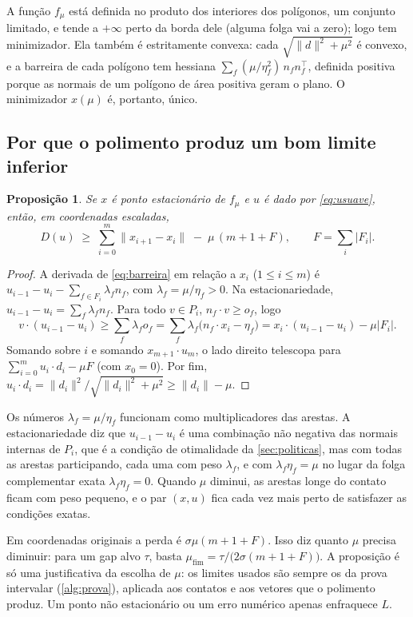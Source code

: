 \documentclass[11pt,a4paper]{article}
\theoremstyle{plain}\newtheorem{proposicao}{Proposição}
\theoremstyle{definition}\newtheorem{definicao}{Definição}
\theoremstyle{plain}\newtheorem{teorema}{Teorema}
\newcommand{\norm}[1]{\lVert#1\rVert}
\newcommand{\abs}[1]{\lvert#1\rvert}
\begin{document}
A função \(f_\mu\) está definida no produto dos interiores dos polígonos, um conjunto limitado, e tende a \(+\infty\) perto da borda dele (alguma folga vai a zero); logo tem minimizador. Ela também é estritamente convexa: cada \(\sqrt{\norm d^2+\mu^2}\) é convexo, e a barreira de cada polígono tem hessiana \(\sum_f(\mu/\eta_f^2)\,n_fn_f^{\top}\), definida positiva porque as normais de um polígono de área positiva geram o plano. O minimizador \(x(\mu)\) é, portanto, único.

\subsection{Por que o polimento produz um bom limite inferior}
\begin{proposicao}\label{prop:barreira}
Se \(x\) é ponto estacionário de \(f_\mu\) e \(u\) é dado por \eqref{eq:usuave}, então, em coordenadas escaladas,
\[
D(u)\;\ge\;\sum_{i=0}^m\norm{x_{i+1}-x_i}\;-\;\mu\,(m+1+F),\qquad F=\textstyle\sum_i\abs{F_i}.
\]
\end{proposicao}
\begin{proof}
A derivada de \eqref{eq:barreira} em relação a \(x_i\) (\(1\le i\le m\)) é \(u_{i-1}-u_i-\sum_{f\in F_i}\lambda_fn_f\), com \(\lambda_f=\mu/\eta_f>0\). Na estacionariedade, \(u_{i-1}-u_i=\sum_f\lambda_fn_f\). Para todo \(v\in P_i\), \(n_f\cdot v\ge o_f\), logo
\[
v\cdot(u_{i-1}-u_i)\ge\sum_f\lambda_fo_f=\sum_f\lambda_f\bigl(n_f\cdot x_i-\eta_f\bigr)=x_i\cdot(u_{i-1}-u_i)-\mu\abs{F_i}.
\]
Somando sobre \(i\) e somando \(x_{m+1}\cdot u_m\), o lado direito telescopa para \(\sum_{i=0}^mu_i\cdot d_i-\mu F\) (com \(x_0=0\)). Por fim, \(u_i\cdot d_i=\norm{d_i}^2/\sqrt{\norm{d_i}^2+\mu^2}\ge\norm{d_i}-\mu\).
\end{proof}
Os números \(\lambda_f=\mu/\eta_f\) funcionam como multiplicadores das arestas. A estacionariedade diz que \(u_{i-1}-u_i\) é uma combinação não negativa das normais internas de \(P_i\), que é a condição de otimalidade da \cref{sec:politicas}, mas com todas as arestas participando, cada uma com peso \(\lambda_f\), e com \(\lambda_f\eta_f=\mu\) no lugar da folga complementar exata \(\lambda_f\eta_f=0\). Quando \(\mu\) diminui, as arestas longe do contato ficam com peso pequeno, e o par \((x,u)\) fica cada vez mais perto de satisfazer as condições exatas.

Em coordenadas originais a perda é \(\sigma\mu(m+1+F)\). Isso diz quanto \(\mu\) precisa diminuir: para um gap alvo \(\tau\), basta \(\mu_{\text{fim}}=\tau/\bigl(2\sigma(m+1+F)\bigr)\). A proposição é só uma justificativa da escolha de \(\mu\): os limites usados são sempre os da prova intervalar (\cref{alg:prova}), aplicada aos contatos e aos vetores que o polimento produz. Um ponto não estacionário ou um erro numérico apenas enfraquece \(L\).
\end{document}
